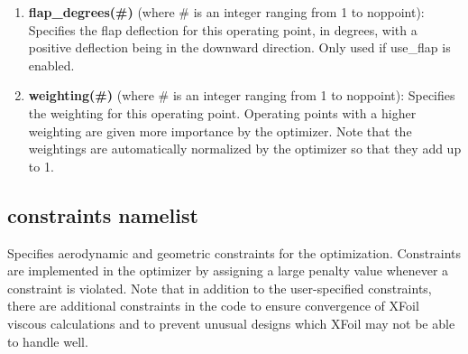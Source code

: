 \documentclass[11pt]{article}
\begin{document}
\begin{enumerate}
{the Mach number for this operating point.  Note that XFoil calculations are not accurate
at or above the transonic regime, so do not specify too high a Mach number.}
\item{\textbf{flap\_degrees(\#)} (where \# is an integer ranging from 1 to noppoint):
Specifies the flap deflection for this operating point, in degrees, with a positive
deflection being in the downward direction. Only used if use\_flap is enabled.}
\item{\textbf{weighting(\#)} (where \# is an integer ranging from 1 to noppoint): Specifies
the weighting for this operating point.  Operating points with a higher weighting are
given more importance by the optimizer.  Note that the weightings are automatically 
normalized by the optimizer so that they add up to 1.}
\end{enumerate}

\subsection{constraints namelist}

Specifies aerodynamic and geometric constraints for the optimization.  Constraints are
implemented in the optimizer by assigning a large penalty value whenever a constraint is
violated.  Note that in addition to the user-specified constraints, there are additional
constraints in the code to ensure convergence of XFoil viscous calculations and to prevent
unusual designs which XFoil may not be able to handle well.
\end{document}
